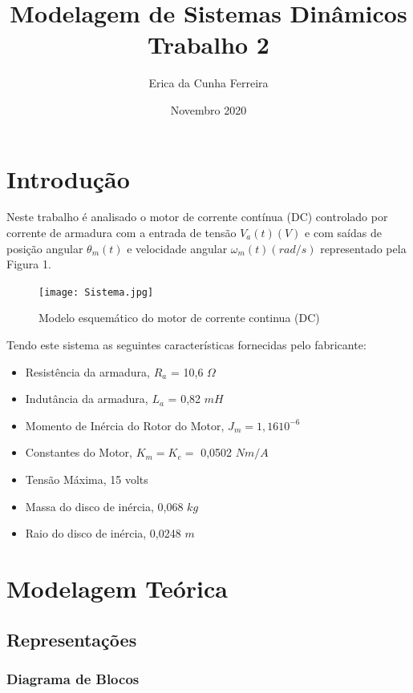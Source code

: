 \documentclass[12pt]{article}
\title{%
    Modelagem de Sistemas Dinâmicos\\ %
    \large Trabalho 2}
\author{Erica da Cunha Ferreira }
\date{Novembro 2020}
\begin{document}
\maketitle
{} 

\newpage
\tableofcontents
\newpage
{} 

\cleardoublepage{}
\section{Introdução}

\quad  Neste trabalho é analisado o motor de corrente contínua (DC) controlado por corrente de armadura com a entrada de tensão $V_a (t)(V)$ e com saídas de posição angular $\theta_m (t)$ e velocidade angular $\omega_m (t)(rad/s)$ representado pela Figura 1.

\begin{figure}[H]
    \centering
    \texttt{[image: Sistema.jpg]}
    \caption{Modelo esquemático do motor de corrente continua (DC)}
    \label{fig:mesh1}
\end{figure}

Tendo este sistema as seguintes características fornecidas pelo fabricante:

\begin{itemize}
    \item Resistência da armadura, $R_a$ = 10,6 $\Omega$
    \item Indutância da armadura, $L_a$ = 0,82 $mH$
    \item Momento de Inércia do Rotor do Motor, $J_m = 1,16 10^{-6}$ 
    \item Constantes do Motor, $K_m = K_e =$ 0,0502 $Nm/A$
    \item Tensão Máxima, 15 volts
    \item Massa do disco de inércia, 0,068 $kg$
    \item Raio do disco de inércia, 0,0248 $m$
\end{itemize}

\section{Modelagem Teórica}

\subsection{Representações}

\subsubsection{Diagrama de Blocos}
\end{document}
